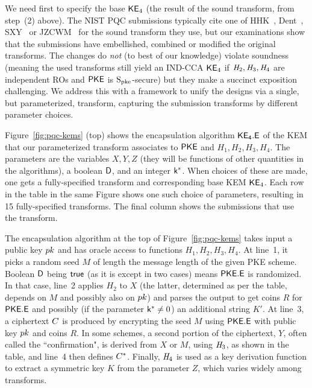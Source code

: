 We need first to specify the base  ${\mathsf{KE}}_{4}$ (the result of the sound transform, from step~(2) above). The NIST PQC submissions typically cite one of HHK~\cite{TCC:HofHovKil17}, Dent~\cite{IMA:Dent03}, SXY~\cite{EC:SaiXagYam18} or JZCWM~\cite{C:JZCWM18} for the sound transform they use, but our examinations show that the submissions have embellished, combined or modified the original transforms. The changes do \textit{not} (to best of our knowledge) violate soundness (meaning the used transforms still yield an IND-CCA ${\mathsf{KE}}_{4}$ if $\mathit{H}_2,\mathit{H}_3,\mathit{H}_4$ are independent ROs and ${\mathsf{PKE}}$ is $\mathrm{S}_{\mathrm{pke}}$-secure) but they make a succinct exposition challenging. We address this with a framework to unify the designs via a single, but parameterized, transform, capturing the submission transforms by different parameter choices. 

Figure~\ref{fig:pqc-kems} (top) shows the encapsulation algorithm $\mathsf{{\mathsf{KE}}_{4}.E}$ of the KEM that our parameterized transform associates to ${\mathsf{PKE}}$ and $H_1,H_2,H_3,H_4$. The parameters are the variables $X,Y,Z$ (they will be functions of other quantities in the algorithms), a boolean $\mathsf{D}$, and an integer $\mathsf{k}^*$. When choices of these are made, one gets a fully-specified transform and corresponding base KEM ${\mathsf{KE}}_{4}$. Each row in the table in the same Figure shows one such choice of parameters, resulting in 15 fully-specified transforms. The final column shows the submissions that use the transform. 

The encapsulation algorithm at the top of Figure~\ref{fig:pqc-kems} takes input a public key $pk$ and has oracle access to functions $H_1,H_2,H_3,H_4$. At line~1, it picks a random seed $M$ of length the message length of the given PKE scheme. Boolean $\mathsf{D}$ being $\mathsf{true}$ (as it is except in two cases) means $\mathsf{{\mathsf{PKE}}.E}$ is randomized. In that case, line~2 applies $H_2$ to $X$ (the latter, determined as per the table, depends on $M$ and possibly also on $pk$) and parses the output to get coins $R$ for $\mathsf{{\mathsf{PKE}}.E}$ and possibly (if the parameter $\mathsf{k}^*\neq 0$) an additional string $K'$. At line~3, a ciphertext $C$ is produced by encrypting the seed $M$ using $\mathsf{{\mathsf{PKE}}.E}$ with public key $pk$ and coins $R$. In some schemes, a second portion of the ciphertext, $Y$, often called the ``confirmation", is derived from $X$ or $M$, using $\mathit{H}_3$, as shown in the table, and line~4 then defines $C^*$. Finally, $\mathit{H}_4$ is used as a key derivation function to extract a symmetric key $K$ from the parameter $Z$, which varies widely among transforms. 

